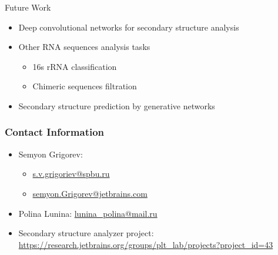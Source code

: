 \documentclass[xcolor=table]{beamer}
\begin{document}
\begin{frame}{Future Work}
\begin{itemize}
    \item Deep convolutional networks for secondary structure analysis
    \item Other RNA sequences analysis tasks
    \begin{itemize}
        \item 16s rRNA classification
        \item Chimeric sequences filtration
    \end{itemize}
    \item Secondary structure prediction by generative networks
\end{itemize}

\end{frame}

\begin{frame}
\frametitle{Contact Information}
\begin{itemize}
  \item Semyon Grigorev:
    \begin{itemize}
      \item \href{mailto:s.v.grigoriev@spbu.ru}{s.v.grigoriev@spbu.ru}
      \item \href{mailto:semyon.grigorev@jetbrains.com}{semyon.Grigorev@jetbrains.com}
    \end{itemize}
  \item Polina Lunina: \href{mailto:lunina\_polina@mail.ru}{lunina\_polina@mail.ru}
  \item Secondary structure analyzer project: \href{https://research.jetbrains.org/groups/plt\_lab/projects?project\_id=43}{https://research.jetbrains.org/groups/plt\_lab/projects?project\_id=43}
\end{itemize}
\vspace{0.3cm}
\end{frame}
\end{document}
